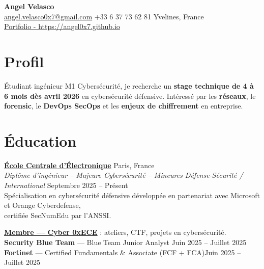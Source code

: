 \documentclass[a4paper,10pt]{article}
\newcommand{\linkedtitle}[2]{\href{#1}{\textbf{\color{myblue}#2}}}
\begin{document}
\begin{center}
    {\LARGE \textbf{Angel Velasco}}\\[3pt]
    \small
    \href{mailto:angel.velasco0x7@gmail.com}{angel.velasco0x7@gmail.com} \quad
    +33 6 37 73 62 81 \quad
    Yvelines, France \\
    {\Large \href{https://angel0x7.github.io}{Portfolio - https://angel0x7.github.io}} 
\end{center}



\section*{Profil}

\begin{center}
Étudiant ingénieur M1 Cybersécurité, je recherche un \textbf{stage technique de 4 à 6 mois dès avril 2026} en cybersécurité défensive.  
Intéressé par les \textbf{réseaux}, le \textbf{forensic}, le \textbf{DevOps SecOps} et les \textbf{enjeux de chiffrement} en entreprise.

\end{center}




\section*{Éducation}

\noindent
\linkedtitle{https://www.ece.fr/en/program/engineering-cycle-bac4-information-systems-and-cybersecurity-major/}{École Centrale d'Électronique} \hfill Paris, France \\
\emph{Diplôme d'ingénieur – Majeure Cybersécurité – Mineures Défense-Sécurité / International} \hfill Septembre 2025 -- Présent \\
Spécialisation en cybersécurité défensive développée en partenariat avec Microsoft et Orange Cyberdefense,\\ certifiée SecNumEdu par l’ANSSI. 

\noindent
\textbf{\href{https://www.linkedin.com/company/asso0xece/}{Membre — Cyber 0xECE}} : ateliers, CTF, projets en cybersécurité. \\
\textbf{Security Blue Team} — Blue Team Junior Analyst \hfill Juin 2025 -- Juillet 2025 \\
\textbf{Fortinet} — Certified Fundamentals \& Associate (FCF + FCA)\hfill Juin 2025 -- Juillet 2025 
\end{document}
